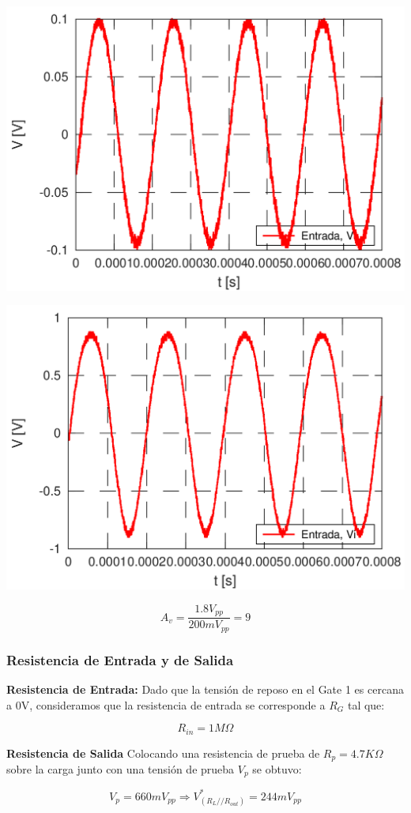 \documentclass[a4paper, 10pt, spanish]{article}
\begin{document}
\begin{center}
  \includegraphics[width=.5\textwidth]{vi.png}
  \label{fig:vi_med}
\end{center}

\begin{center}
  \includegraphics[width=.5\textwidth]{vo.png}
  \label{fig:vo_med}
\end{center}


\begin{equation}
  A_v=\frac{1.8V_{pp}}{200mV_{pp}}=9
\end{equation}

\subsubsection{Resistencia de Entrada y de Salida}
\textbf{Resistencia de Entrada:}
Dado que la tensión de reposo en el Gate 1 es cercana a 0V, consideramos que la resistencia de entrada se corresponde a $R_G$ tal que:

\begin{equation}
  R_{in}=1M\Omega
\end{equation}

\textbf{Resistencia de Salida}
Colocando una resistencia de prueba de $R_p = 4.7K\Omega$ sobre la carga junto con una tensión de prueba $V_p$ se obtuvo:

\begin{equation}
  V_p= 660mV_{pp} \Rightarrow V^*_{(R_L//R_{out})} = 244 mV_{pp}
\end{equation}
\end{document}
